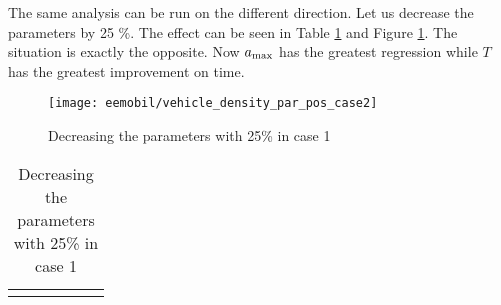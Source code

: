 		The same analysis can be run on the different direction. Let us decrease the parameters by 25 \%. The effect can be seen in Table \ref{tab:vehicle_density_par_pos_case_2} and Figure \ref{fig:vehicle_density_par_pos_case_2}. The situation is exactly the opposite. Now $a_{\rm max}$ has the greatest regression while $T$ has the greatest improvement on time.
		\begin{figure}[ht]
			\centering
			\texttt{[image: eemobil/vehicle\_density\_par\_pos\_case2]}
			\caption{Decreasing the parameters with 25\% in case 1}
			\label{fig:vehicle_density_par_pos_case_2}
		\end{figure}
		\begin{table}[ht]
			\begin{center}
				\begin{tabular}{ |c|c|c|c|c|c|}
				\hline
				\vehicledensitypartable{2}
				\hline
				\end{tabular}
			\end{center}
			\caption{Decreasing the parameters with 25\% in case 1}
			\label{tab:vehicle_density_par_pos_case_2}
		\end{table}
